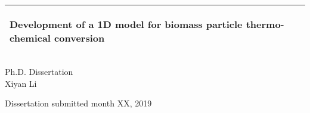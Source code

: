 %
\begin{titlepage}
  \addtolength{\hoffset}{0.5\evensidemargin-0.5\oddsidemargin} %
  \noindent%
  \begin{tabular}{@{}p{\textwidth}@{}}
    \toprule[2pt]
    \midrule
    \vspace{0.2cm}
    \begin{center}
    \Huge{\textbf{
      Development of a 1D model for biomass particle thermo-chemical conversion%
    }}
    \end{center}
    \vspace{0.2cm}\\
    \midrule
    \toprule[2pt]
  \end{tabular}
  \vspace{4 cm}
  \begin{center}
    {\large
      Ph.D. Dissertation%
    }\\
    \vspace{0.2cm}
    {\Large
      Xiyan Li%
    }
  \end{center}
  \vfill
  \begin{center}
  Dissertation submitted month XX, 2019
  \end{center}
\end{titlepage}
\clearpage
